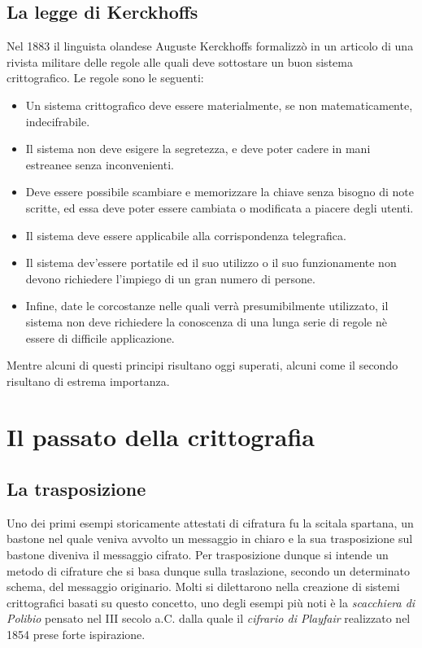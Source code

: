 \documentclass[a4paper, 12pt]{article}
\begin{document}
\subsection{La legge di Kerckhoffs}
Nel 1883 il linguista olandese Auguste Kerckhoffs formalizzò in un articolo di una rivista militare delle regole alle quali deve sottostare un buon sistema crittografico. Le regole sono le seguenti:
\begin{itemize}
	\item Un sistema crittografico deve essere materialmente, se non matematicamente, indecifrabile.
	\item Il sistema non deve esigere la segretezza, e deve poter cadere in mani estreanee senza inconvenienti.
	\item Deve essere possibile scambiare e memorizzare la chiave senza bisogno di note scritte, ed essa deve poter essere cambiata o modificata a piacere degli utenti.
	\item Il sistema deve essere applicabile alla corrispondenza telegrafica.
	\item Il sistema dev'essere portatile ed il suo utilizzo o il suo funzionamente non devono richiedere l'impiego di un gran numero di persone.
	\item Infine, date le corcostanze nelle quali verrà presumibilmente utilizzato, il sistema non deve richiedere la conoscenza di una lunga serie di regole nè essere di difficile applicazione.
\end{itemize}
Mentre alcuni di questi principi risultano oggi superati, alcuni come il secondo risultano di estrema importanza.
\section{Il passato della crittografia}
\subsection{La trasposizione}
Uno dei primi esempi storicamente attestati di cifratura fu la scitala spartana, un bastone nel quale veniva avvolto un messaggio in chiaro e la sua trasposizione sul bastone diveniva il messaggio cifrato. Per trasposizione dunque si intende un metodo di cifrature che si basa dunque sulla traslazione, secondo un determinato schema, del messaggio originario.\newline
Molti si dilettarono nella creazione di sistemi crittografici basati su questo concetto, uno degli esempi più noti è la \textit{scacchiera di Polibio} pensato nel III secolo a.C. dalla quale il \textit{cifrario di Playfair} realizzato nel 1854 prese forte ispirazione.
\end{document}
